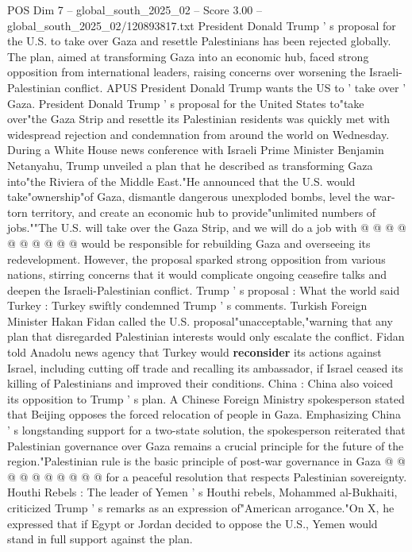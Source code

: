 \begin{textsample}{POS Dim 7 – global\_south\_2025\_02 – Score 3.00 – global\_south\_2025\_02/120893817.txt}  \label{ex:f7_pos_423}
President Donald Trump ' s proposal for the U.S. to take over Gaza and resettle Palestinians has been rejected globally.
The plan, aimed at transforming Gaza into an economic hub, faced strong opposition from international leaders, raising concerns over worsening the Israeli-Palestinian conflict.
APUS President Donald Trump wants the US to ' take over ' Gaza.
President Donald Trump ' s proposal for the United States to"take over"the Gaza Strip and resettle its Palestinian residents was quickly met with widespread rejection and condemnation from around the world on Wednesday.
During a White House news conference with Israeli Prime Minister Benjamin Netanyahu, Trump unveiled a plan that he described as transforming Gaza into"the Riviera of the Middle East."He announced that the U.S. would take"ownership"of Gaza, dismantle dangerous unexploded bombs, level the war-torn territory, and create an economic hub to provide"unlimited numbers of jobs.""The U.S. will take over the Gaza Strip, and we will do a job with @ @ @ @ @ @ @ @ @ @ would be responsible for rebuilding Gaza and overseeing its redevelopment.
However, the proposal sparked strong opposition from various nations, stirring concerns that it would complicate ongoing ceasefire talks and deepen the Israeli-Palestinian conflict.
Trump ' s proposal : What the world said Turkey : Turkey swiftly condemned Trump ' s comments.
Turkish Foreign Minister Hakan Fidan called the U.S. proposal"unacceptable,"warning that any plan that disregarded Palestinian interests would only escalate the conflict.
Fidan told Anadolu news agency that Turkey would \textbf{reconsider} its actions against Israel, including cutting off trade and recalling its ambassador, if Israel ceased its killing of Palestinians and improved their conditions.
China : China also voiced its opposition to Trump ' s plan.
A Chinese Foreign Ministry spokesperson stated that Beijing opposes the forced relocation of people in Gaza.
Emphasizing China ' s longstanding support for a two-state solution, the spokesperson reiterated that Palestinian governance over Gaza remains a crucial principle for the future of the region."Palestinian rule is the basic principle of post-war governance in Gaza @ @ @ @ @ @ @ @ @ @ for a peaceful resolution that respects Palestinian sovereignty.
Houthi Rebels : The leader of Yemen ' s Houthi rebels, Mohammed al-Bukhaiti, criticized Trump ' s remarks as an expression of"American arrogance."On X, he expressed that if Egypt or Jordan decided to oppose the U.S., Yemen would stand in full support against the plan.

\end{textsample}
